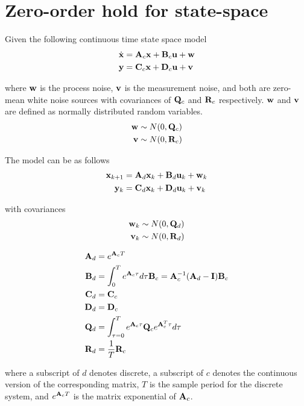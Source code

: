 \section{Zero-order hold for state-space}

Given the following continuous time state space model
\begin{align*}
  \dot{\mathbf{x}} &= \mathbf{A}_c\mathbf{x} + \mathbf{B}_c\mathbf{u} + \mathbf{w} \\
  \mathbf{y} &= \mathbf{C}_c\mathbf{x} + \mathbf{D}_c\mathbf{u} + \mathbf{v}
\end{align*}

where $\mathbf{w}$ is the process noise, $\mathbf{v}$ is the measurement noise, and
both are zero-mean white noise sources with covariances of $\mathbf{Q}_c$ and
$\mathbf{R}_c$ respectively. $\mathbf{w}$ and $\mathbf{v}$ are defined as normally
distributed random variables.
\begin{align*}
  \mathbf{w} &\sim N(0, \mathbf{Q}_c) \\
  \mathbf{v} &\sim N(0, \mathbf{R}_c)
\end{align*}

The model can be  as follows
\begin{align*}
  \mathbf{x}_{k+1} &= \mathbf{A}_d \mathbf{x}_k + \mathbf{B}_d \mathbf{u}_k + \mathbf{w}_k \\
   \mathbf{y}_k &= \mathbf{C}_d \mathbf{x}_k + \mathbf{D}_d \mathbf{u}_k + \mathbf{v}_k
\end{align*}

with covariances
\begin{align*}
  \mathbf{w}_k &\sim N(0, \mathbf{Q}_d) \\
  \mathbf{v}_k &\sim N(0, \mathbf{R}_d)
\end{align*}
\begin{theorem}
  \label{thm:zoh_ss}
  \begin{align}
    \mathbf{A}_d &= e^{\mathbf{A}_c T} \\
    \mathbf{B}_d &= \int_0^T e^{\mathbf{A}_c \tau} d\tau \mathbf{B}_c =
      \mathbf{A}_c^{-1} (\mathbf{A}_d - \mathbf{I}) \mathbf{B}_c \\
    \mathbf{C}_d &= \mathbf{C}_c \\
    \mathbf{D}_d &= \mathbf{D}_c \\
    \mathbf{Q}_d &= \int_{\tau = 0}^{T} e^{\mathbf{A}_c\tau} \mathbf{Q}_c
      e^{\mathbf{A}_c^T\tau} d\tau \\
    \mathbf{R}_d &= \frac{1}{T}\mathbf{R}_c
  \end{align}

  where a subscript of $d$ denotes discrete, a subscript of $c$ denotes the
  continuous version of the corresponding matrix, $T$ is the sample period for
  the discrete \gls{system}, and $e^{\mathbf{A}_c T}$ is the matrix exponential of
  $\mathbf{A}_c$.
\end{theorem}

